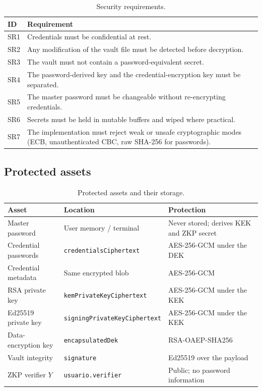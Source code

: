 \documentclass[11pt,a4paper]{article}
\newcommand{\code}[1]{\texttt{#1}}
\begin{document}
\begin{table}[htbp]
\centering
\small
\begin{tabular}{@{}p{1.2cm}p{13.2cm}@{}}
\toprule
\textbf{ID} & \textbf{Requirement} \\
\midrule
SR1 & Credentials must be confidential at rest. \\
SR2 & Any modification of the vault file must be detected before decryption. \\
SR3 & The vault must not contain a password-equivalent secret. \\
SR4 & The password-derived key and the credential-encryption key must be
      separated. \\
SR5 & The master password must be changeable without re-encrypting credentials. \\
SR6 & Secrets must be held in mutable buffers and wiped where practical. \\
SR7 & The implementation must reject weak or unsafe cryptographic modes
      (ECB, unauthenticated CBC, raw SHA-256 for passwords). \\
\bottomrule
\end{tabular}
\caption{Security requirements.}
\label{tab:sr}
\end{table}

\subsection{Protected assets}

\begin{table}[htbp]
\centering
\small
\begin{tabular}{@{}p{4.6cm}p{4.4cm}p{5.4cm}@{}}
\toprule
\textbf{Asset} & \textbf{Location} & \textbf{Protection} \\
\midrule
Master password & User memory / terminal & Never stored; derives KEK and ZKP secret \\
Credential passwords & \code{credentialsCiphertext} & AES-256-GCM under the DEK \\
Credential metadata & Same encrypted blob & AES-256-GCM \\
RSA private key & \code{kemPrivateKeyCiphertext} & AES-256-GCM under the KEK \\
Ed25519 private key & \code{signingPrivateKeyCiphertext} & AES-256-GCM under the KEK \\
Data-encryption key & \code{encapsulatedDek} & RSA-OAEP-SHA256 \\
Vault integrity & \code{signature} & Ed25519 over the payload \\
ZKP verifier $Y$ & \code{usuario.verifier} & Public; no password information \\
\bottomrule
\end{tabular}
\caption{Protected assets and their storage.}
\label{tab:assets}
\end{table}
\end{document}
